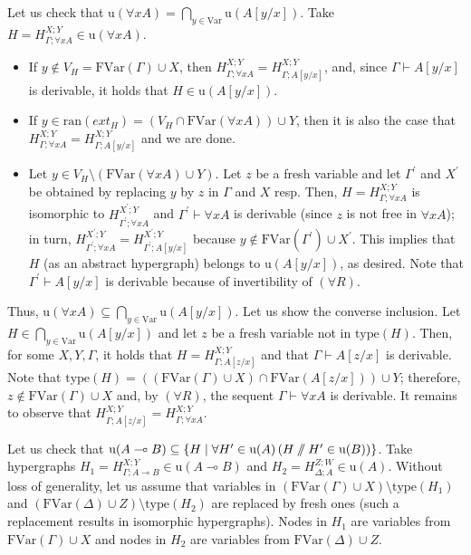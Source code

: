 \documentclass[a4paper,UKenglish,cleveref, autoref, thm-restate,pdfa]{lipics-v2021}
\newcommand{\ran}{\mathrm{ran}}
\newcommand{\ext}{\mathit{ext}}
\newcommand{\type}{\mathrm{type}}
\newcommand{\Var}{\mathrm{Var}}
\newcommand{\FVar}{\mathrm{FVar}}
\newcommand{\limpl}{\multimap}
\newcommand{\pc}{\mathbin{/\mkern-6mu/}}
\begin{document}
Let us check that $\mathrm{u}(\forall x A) = \bigcap\limits_{y \in \Var} \mathrm{u}(A[y/x])$. Take $H = H^{X;Y}_{\Gamma;\forall x A} \in \mathrm{u}(\forall x A)$. 
\begin{itemize}
	\item If $y \notin V_H = \FVar(\Gamma) \cup X$, then $H^{X;Y}_{\Gamma; \forall x A} = H^{X;Y}_{\Gamma;A[y/x]}$, and, since $\Gamma \vdash A[y/x]$ is derivable, it holds that $H \in \mathrm{u}(A[y/x])$. 
	\item If $y \in \ran(\ext_H) = (V_H \cap \FVar(\forall x A)) \cup Y$, then it is also the case that $H^{X;Y}_{\Gamma; \forall x A} = H^{X;Y}_{\Gamma;A[y/x]}$ and we are done.
	\item Let $y \in V_H \setminus (\FVar(\forall x A) \cup Y)$. Let $z$ be a fresh variable and let $\Gamma^\prime$ and $X^\prime$ be obtained by replacing $y$ by $z$ in $\Gamma$ and $X$ resp. Then, $H = H^{X;Y}_{\Gamma;\forall x A}$ is isomorphic to $H_{\Gamma^\prime;\forall x A}^{X^\prime;Y}$ and $\Gamma^\prime \vdash \forall x A$ is derivable (since $z$ is not free in $\forall x A$); in turn, $H_{\Gamma^\prime;\forall x A}^{X^\prime;Y} = H_{\Gamma^\prime;A[y/x]}^{X^\prime;Y}$ because $y \notin \FVar(\Gamma^\prime) \cup X^\prime$. This implies that $H$ (as an abstract hypergraph) belongs to $\mathrm{u}(A[y/x])$, as desired. Note that $\Gamma^\prime \vdash A[y/x]$ is derivable because of invertibility of $(\forall R)$. 
\end{itemize}
Thus, $\mathrm{u}(\forall x A) \subseteq \bigcap\limits_{y \in \Var} \mathrm{u}(A[y/x])$. Let us show the converse inclusion. Let $H \in \bigcap\limits_{y \in \Var} \mathrm{u}(A[y/x])$ and let $z$ be a fresh variable not in $\type(H)$. Then, for some $X,Y,\Gamma$, it holds that $H = H^{X;Y}_{\Gamma;A[z/x]}$ and that $\Gamma \vdash A[z/x]$ is derivable. Note that $\type(H) = ((\FVar(\Gamma) \cup X) \cap \FVar(A[z/x])) \cup Y$; therefore, $z \notin \FVar(\Gamma) \cup X$ and, by $(\forall R)$, the sequent $\Gamma \vdash \forall x A$ is derivable. It remains to observe that $H^{X;Y}_{\Gamma;A[z/x]} = H^{X;Y}_{\Gamma;\forall x A}$.


Let us check that $\mathrm{u}(A \limpl B) \subseteq \{H \mid \forall H^\prime \in \mathrm{u}(A) \, (H \pc H^\prime \in \mathrm{u}(B))\}$. Take hypergraphs $H_1 = H_{\Gamma;A \limpl B}^{X;Y} \in \mathrm{u}(A \limpl B)$ and $H_2 = H_{\Delta;A}^{Z;W} \in \mathrm{u}(A)$. Without loss of generality, let us assume that variables in $(\FVar(\Gamma) \cup X) \setminus \type(H_1)$ and $(\FVar(\Delta) \cup Z) \setminus \type(H_2)$ are replaced by fresh ones (such a replacement results in isomorphic hypergraphs). Nodes in $H_1$ are variables from $\FVar(\Gamma) \cup X$ and nodes in $H_2$ are variables from $\FVar(\Delta) \cup Z$.
\end{document}

